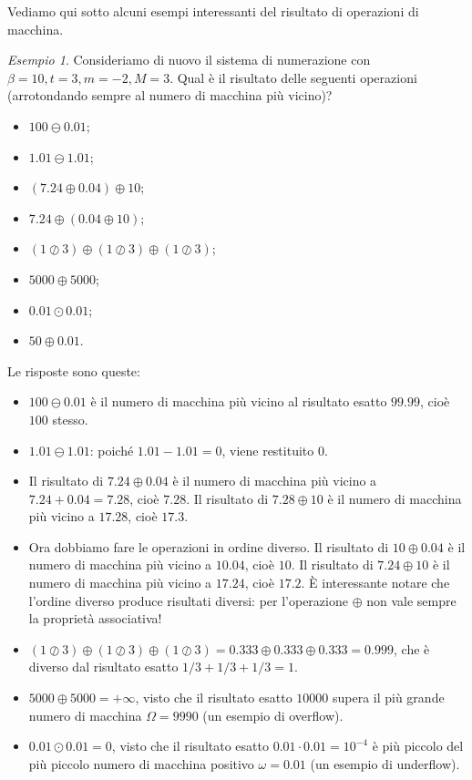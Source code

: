 \documentclass[a4paper]{report}
\theoremstyle{definition}
\theoremstyle{remark}
\newtheorem{esempio}[theorem]{Esempio}
\begin{document}
Vediamo qui sotto alcuni esempi interessanti del risultato di operazioni di macchina.
\begin{esempio} \label{ese: miscellanea numeri di macchina}
Consideriamo di nuovo il sistema di numerazione con $\beta=10, t=3, m=-2, M=3$. Qual è il risultato delle seguenti operazioni (arrotondando sempre al numero di macchina più vicino)? 
\begin{itemize}
    \item $100 \ominus 0.01$;
    \item $1.01 \ominus 1.01$;
    \item $(7.24 \oplus 0.04) \oplus 10$;
    \item $7.24 \oplus (0.04 \oplus 10)$;
    \item $(1 \oslash 3) \oplus (1 \oslash 3) \oplus (1 \oslash 3)$;
    \item $5000 \oplus 5000$; 
    \item $0.01 \odot 0.01$;
    \item $50 \oplus 0.01$.
\end{itemize}
\end{esempio}
Le risposte sono queste:
\begin{itemize}
    \item $100 \ominus 0.01$ è il numero di macchina più vicino al risultato esatto $99.99$, cioè $100$ stesso.
    \item $1.01 \ominus 1.01$: poiché $1.01-1.01 = 0$, viene restituito $0$.
    \item Il risultato di $7.24 \oplus 0.04$ è il numero di macchina più vicino a $7.24+0.04 = 7.28$, cioè $7.28$. Il risultato di $ 7.28\oplus 10$ è il numero di macchina più vicino a $17.28$, cioè $17.3$.
    \item Ora dobbiamo fare le operazioni in ordine diverso. Il risultato di $10 \oplus 0.04$ è il numero di macchina più vicino a $10.04$, cioè $10$. Il risultato di $7.24\oplus 10$ è il numero di macchina più vicino a $17.24$, cioè $17.2$. È interessante notare che l'ordine diverso produce risultati diversi: per l'operazione $\oplus$ non vale sempre la proprietà associativa!
    \item $(1 \oslash 3) \oplus (1 \oslash 3) \oplus (1 \oslash 3) = 0.333 \oplus 0.333 \oplus 0.333 = 0.999$, che è diverso dal risultato esatto $1/3 + 1/3 + 1/3 = 1$.
    \item $5000 \oplus 5000 = +\infty$, visto che il risultato esatto $10000$ supera il più grande numero di macchina $\Omega = 9990$ (un esempio di overflow).
    \item $0.01 \odot 0.01 = 0$, visto che il risultato esatto $0.01 \cdot 0.01 = 10^{-4}$ è più piccolo del più piccolo numero di macchina positivo $\omega = 0.01$ (un esempio di underflow).
\end{itemize}
\end{document}
